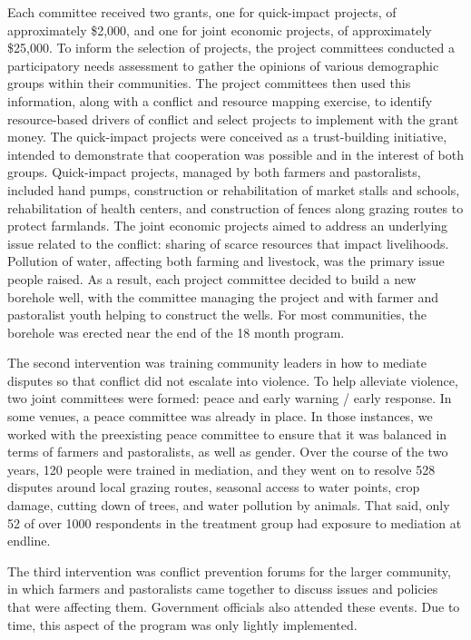 \documentclass[
]{article}
\begin{document}
Each committee received two grants, one for quick-impact projects, of
approximately \$2,000, and one for joint economic projects, of
approximately \$25,000. To inform the selection of projects, the project
committees conducted a participatory needs assessment to gather the
opinions of various demographic groups within their communities. The
project committees then used this information, along with a conflict and
resource mapping exercise, to identify resource-based drivers of
conflict and select projects to implement with the grant money. The
quick-impact projects were conceived as a trust-building initiative,
intended to demonstrate that cooperation was possible and in the
interest of both groups. Quick-impact projects, managed by both farmers
and pastoralists, included hand pumps, construction or rehabilitation of
market stalls and schools, rehabilitation of health centers, and
construction of fences along grazing routes to protect farmlands. The
joint economic projects aimed to address an underlying issue related to
the conflict: sharing of scarce resources that impact livelihoods.
Pollution of water, affecting both farming and livestock, was the
primary issue people raised. As a result, each project committee decided
to build a new borehole well, with the committee managing the project
and with farmer and pastoralist youth helping to construct the wells.
For most communities, the borehole was erected near the end of the 18
month program.

The second intervention was training community leaders in how to mediate
disputes so that conflict did not escalate into violence. To help
alleviate violence, two joint committees were formed: peace and early
warning / early response. In some venues, a peace committee was already
in place. In those instances, we worked with the preexisting peace
committee to ensure that it was balanced in terms of farmers and
pastoralists, as well as gender. Over the course of the two years, 120
people were trained in mediation, and they went on to resolve 528
disputes around local grazing routes, seasonal access to water points,
crop damage, cutting down of trees, and water pollution by animals. That
said, only 52 of over 1000 respondents in the treatment group had
exposure to mediation at endline.

The third intervention was conflict prevention forums for the larger
community, in which farmers and pastoralists came together to discuss
issues and policies that were affecting them. Government officials also
attended these events. Due to time, this aspect of the program was only
lightly implemented.
\end{document}
